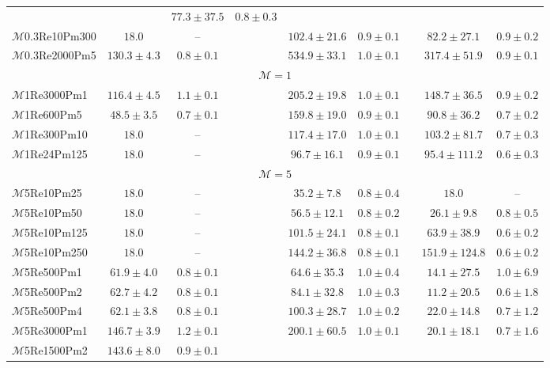 \documentclass[12pt,twoside]{extreport}
\newcommand{\mSonicMach}{\ensuremath{\mathcal{M}}} %
\begin{document}
\begin{table}
{{\begin{threeparttable}
\begin{tabular}{l cc l cc l cc}
	&& $77.3 \pm 37.5$ & $0.8 \pm 0.3$ \\
$\mSonicMach$0.3Re10Pm300
	& $18.0$ & --
	&& $102.4 \pm 21.6$ & $0.9 \pm 0.1$
	&& $82.2 \pm 27.1$ & $0.9 \pm 0.2$ \\
$\mSonicMach$0.3Re2000Pm5
	& $130.3 \pm 4.3$ & $0.8 \pm 0.1$
	&& $534.9 \pm 33.1$ & $1.0 \pm 0.1$
	&& $317.4 \pm 51.9$ & $0.9 \pm 0.1$ \\
\hline
\multicolumn{9}{c}{$\mSonicMach = 1$} \\
\hline
$\mSonicMach$1Re3000Pm1
	& $116.4 \pm 4.5$ & $1.1 \pm 0.1$
	&& $205.2 \pm 19.8$ & $1.0 \pm 0.1$
	&& $148.7 \pm 36.5$ & $0.9 \pm 0.2$ \\
$\mSonicMach$1Re600Pm5
	& $48.5 \pm 3.5$ & $0.7 \pm 0.1$
	&& $159.8 \pm 19.0$ & $0.9 \pm 0.1$
	&& $90.8 \pm 36.2$ & $0.7 \pm 0.2$ \\
$\mSonicMach$1Re300Pm10
	& $18.0$ & --
	&& $117.4 \pm 17.0$ & $1.0 \pm 0.1$
	&& $103.2 \pm 81.7$ & $0.7 \pm 0.3$ \\
$\mSonicMach$1Re24Pm125
	& $18.0$ & --
	&& $96.7 \pm 16.1$ & $0.9 \pm 0.1$
	&& $95.4 \pm 111.2$ & $0.6 \pm 0.3$ \\
\hline
\multicolumn{9}{c}{$\mSonicMach = 5$} \\
\hline
$\mSonicMach$5Re10Pm25
	& $18.0$ & --
	&& $35.2 \pm 7.8$ & $0.8 \pm 0.4$
	&& $18.0$ & -- \\
$\mSonicMach$5Re10Pm50
	& $18.0$ & --
	&& $56.5 \pm 12.1$ & $0.8 \pm 0.2$
	&& $26.1 \pm 9.8$ & $0.8 \pm 0.5$ \\
$\mSonicMach$5Re10Pm125
	& $18.0$ & --
	&& $101.5 \pm 24.1$ & $0.8 \pm 0.1$
	&& $63.9 \pm 38.9$ & $0.6 \pm 0.2$ \\
$\mSonicMach$5Re10Pm250
	& $18.0$ & --
	&& $144.2 \pm 36.8$ & $0.8 \pm 0.1$
	&& $151.9 \pm 124.8$ & $0.6 \pm 0.2$ \\
$\mSonicMach$5Re500Pm1
	& $61.9 \pm 4.0$ & $0.8 \pm 0.1$
	&& $64.6 \pm 35.3$ & $1.0 \pm 0.4$
	&& $14.1 \pm 27.5$ & $1.0 \pm 6.9$ \\
$\mSonicMach$5Re500Pm2
	& $62.7 \pm 4.2$ & $0.8 \pm 0.1$
	&& $84.1 \pm 32.8$ & $1.0 \pm 0.3$
	&& $11.2 \pm 20.5$ & $0.6 \pm 1.8$ \\
$\mSonicMach$5Re500Pm4
	& $62.1 \pm 3.8$ & $0.8 \pm 0.1$
	&& $100.3 \pm 28.7$ & $1.0 \pm 0.2$
	&& $22.0 \pm 14.8$ & $0.7 \pm 1.2$ \\
$\mSonicMach$5Re3000Pm1
	& $146.7 \pm 3.9$ & $1.2 \pm 0.1$
	&& $200.1 \pm 60.5$ & $1.0 \pm 0.1$
	&& $20.1 \pm 18.1$ & $0.7 \pm 1.6$ \\
$\mSonicMach$5Re1500Pm2
	& $143.6 \pm 8.0$ & $0.9 \pm 0.1$

\end{tabular}
\end{threeparttable}}}
\end{table}
\end{document}
